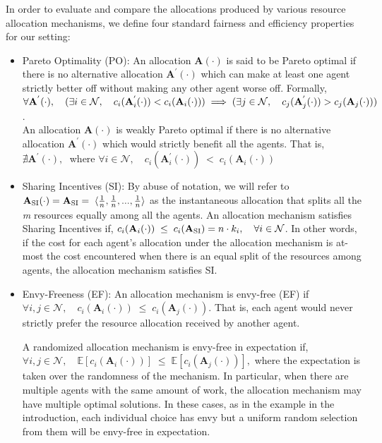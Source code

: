 \documentclass[letterpaper]{article} %
\theoremstyle{definition}
\begin{document}
In order to evaluate and compare the allocations produced by various resource allocation mechanisms, we define four standard fairness and efficiency properties for our setting:
\begin{itemize}
    \item Pareto Optimality (PO): An allocation $\mathbf{A}(\cdot)$ is said to be Pareto optimal if there is no alternative allocation $\mathbf{A}^{'}(\cdot)$  which can make at least one agent strictly better off without making any other agent worse off. Formally, \\ $\forall \mathbf{A}^{'}(\cdot),\quad 
    (\exists i \in \mathcal{N}, \quad c_{i}(\mathbf{A}^{'}_{i}(\cdot)) < c_{i}(\mathbf{A}_{i}(\cdot))) \\ \implies  (\exists j \in \mathcal{N}, \quad c_{j}(\mathbf{A}^{'}_{j}(\cdot)) > c_{j}(\mathbf{A}_{j}(\cdot)))$.
    \\An allocation $\mathbf{A}(\cdot)$  is weakly Pareto optimal if there is no alternative allocation $\mathbf{A}^{'}(\cdot)$ which would strictly benefit all the agents. That is,\\ $\nexists \mathbf{A}^{'}(\cdot), \;$ where $\forall i \in \mathcal{N}, \quad c_{i}(\mathbf{A}^{'}_{i}(\cdot)) \; < \; c_{i}(\mathbf{A}_{i}(\cdot))$
    
    \item Sharing Incentives (SI): By abuse of notation, we will refer to $\mathbf{A}_{\textnormal{SI}}(\cdot) = \mathbf{A}_{\textnormal{SI}} = \; \langle \frac{1}{n}, \frac{1}{n}, ..., \frac{1}{n} \rangle$ as the instantaneous allocation that splits all the \textit{m} resources equally among all the agents. An allocation mechanism satisfies Sharing Incentives if, \quad 
    $c_{i}(\mathbf{A}_{i}(\cdot)) \; \leq \; c_{i}(\mathbf{A}_{\textnormal{SI}}) = n \cdot k_{i}, \quad \forall i \in \mathcal{N}$. In other words, if the cost for each agent's allocation under the allocation mechanism is at-most the cost encountered when there is an equal split of the resources among agents, the allocation mechanism satisfies SI.
    
    \item  Envy-Freeness (EF): An allocation mechanism is envy-free (EF) if 
    \quad $\forall i,j \in \mathcal{N}, \quad c_{i}(\mathbf{A}_{i}(\cdot)) \; \leq \; c_{i}(\mathbf{A}_{j}(\cdot))$. That is, each agent would never strictly prefer the resource allocation received by another agent.
    
    A randomized allocation mechanism is envy-free in expectation if,
    $\forall i,j \in \mathcal{N}, \quad \mathbb{E}[c_{i}(\mathbf{A}_{i}(\cdot))] \; \leq \; \mathbb{E}[c_{i}(\mathbf{A}_{j}(\cdot))],$
    where the expectation is taken over the randomness of the mechanism.  In particular, when there are multiple agents with the same amount of work, the allocation mechanism may have multiple optimal solutions.  In these cases, as in the example in the introduction, each individual choice has envy but a uniform random selection from them will be envy-free in expectation.
    

\end{itemize}
\end{document}

